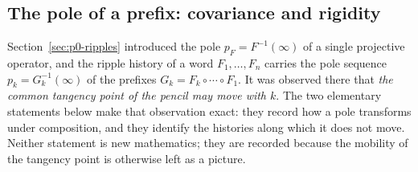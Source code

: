 %
%
%
%
%

\subsection{The pole of a prefix: covariance and rigidity}
\label{subsec:p0-pole-covariance}

Section~\ref{sec:p0-ripples} introduced the pole $p_F=F^{-1}(\infty)$ of a
single projective operator, and the ripple history of a word
$F_1,\dots,F_n$ carries the pole sequence $p_k=G_k^{-1}(\infty)$ of the prefixes
$G_k=F_k\circ\cdots\circ F_1$.  It was observed there that
\emph{the common tangency point of the pencil may move with $k$}.  The two
elementary statements below make that observation exact: they record how a
pole transforms under composition, and they identify the histories along which
it does not move.  Neither statement is new mathematics; they are recorded
because the mobility of the tangency point is otherwise left as a picture.

